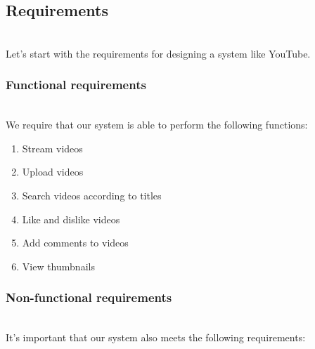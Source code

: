 

\subsection{Requirements}\label{4KUJuIjY-WU5VploGHRVY}
\\
Let's start with the requirements for designing a system like YouTube.

\subsubsection{Functional requirements}\label{rj26YZRNfJWY3jgmBiM-4}
\\
We require that our system is able to perform the following functions:

\begin{enumerate}
\item
\protect{}\label{Vflgoy_p0uzA4cXNu5RNS}
Stream videos
\item
\protect{}\label{_pY-aWTczmYPm3hTFQ8Fm}
Upload videos
\item
\protect{}\label{y98dbzNHCJ-XjPKjfHsp3}
Search videos according to titles
\item
\protect{}\label{TPkeONLOByy4rZIvS-JV7}
Like and dislike videos
\item
\protect{}\label{mpzAYwsr2J7NmFMx8aMul}
Add comments to videos
\item
\protect{}\label{SFdzrhgisTf1zFKsiuqao}
View thumbnails
\end{enumerate}

\subsubsection{Non-functional requirements}\label{go-2Bn_EpbWkRURSbLEyS}
\\
It's important that our system also meets the following requirements:

